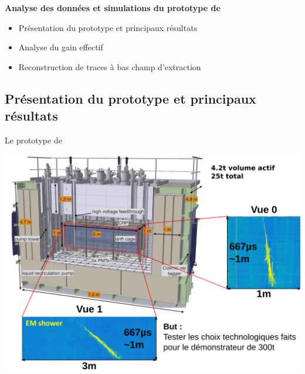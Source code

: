     {
        \begin{specialframe}
            \vspace{2cm}\hspace*{-1.8cm}\parbox[t]{\textwidth}{
                \begin{center}
                    \begin{huge}
                            \textcolor{pheniics_purple}{\textbf{Analyse des données et simulations du prototype de \TOO{}}}
                    \end{huge}
                    \vspace{1cm}
                    \begin{itemize}
                        \item Présentation du prototype et principaux résultats
                        \item Analyse du gain effectif
                        \item Reconstruction de traces à bas champ d'extraction
                    \end{itemize}
                \end{center}
            }
        \end{specialframe}
    }

    
    \subsection[Présentation]{Présentation du prototype et principaux résultats}
   
    \begin{frame}{Le prototype de \TOO{}}
   		\begin{scriptsize}
        	\centering
        	\includegraphics[width=\textwidth]{./pictures/311_2.png}        	
		\end{scriptsize}
   	\end{frame}
   	
